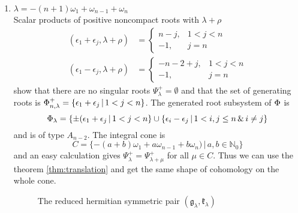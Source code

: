 \begin{enumerate}
 \item $ \lambda = -(n+1)\omega_1 +\omega_{n-1} + \omega_n$\\
   Scalar products of positive noncompact roots with $\lambda+\rho$ 
  \begin{align*}
    (\epsilon_1 + \epsilon_j, \lambda+\rho) & = \begin{cases}
                                                 n-j, & 1<j < n \\
                                                 -1, & j = n
                                                \end{cases}\\
    (\epsilon_1 - \epsilon_j, \lambda+\rho) & = \begin{cases}
                                                 -n-2+j, & 1<j < n \\
                                                 -1, & j = n
                                                \end{cases}
  \end{align*}
  show that there are no singular roots $\Psi^+_\lambda = \emptyset$ and that the set of generating roots is $\Phi^+_{n,\lambda} = \{\epsilon_1 + \epsilon_j \,|\, 1<j<n \}$. The generated root subsystem of $\Phi$ is
  \[
    \Phi_\lambda = \{ \pm(\epsilon_1 + \epsilon_j \,|\, 1<j < n \} \cup \{ \epsilon_i - \epsilon_j \,|\, 1 < i,j \leq n \,\&\, i\neq j \}
  \]
  and is of type $A_{n-2}$. The integral cone is
  \[
   C = \{-(a+b)\omega_1 + a\omega_{n-1} + b\omega_n) \,|\, a,b\in\mathbb{N}_0 \}
  \]
  and an easy calculation gives $\Psi^+_\lambda = \Psi^+_{\lambda+\mu}$ for all $\mu \in C$. Thus we can use the theorem \ref{thm:translation} and get the same shape of cohomology on the whole cone.
  
\begin{figure}[H]
  \centering
{}  
  \caption{The reduced hermitian symmetric pair $(\mathfrak{g}_\lambda, \mathfrak{k}_\lambda)$}
\end{figure}  


\end{enumerate}
